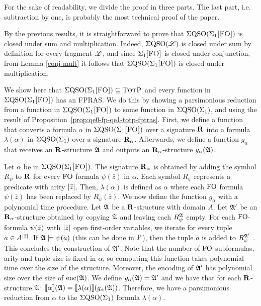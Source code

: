 
For the sake of readability, we divide the proof in three parts. The last part, i.e. subtraction by one, is probably the most technical proof of the paper. 

\medskip

 By the previous results, it is straightforward to prove that $\Sigma{\rm QSO}(\Sigma_{1}\textsc{[FO]})$ is closed under sum and multiplication. Indeed, $\Sigma{\rm QSO}(\mathscr{L})$ is closed under sum by definition for every fragment $\mathscr{L}$, and since $\Sigma_{1}\textsc{[FO]}$ is closed under conjunction, from Lemma \ref{conj-mult} it follows that $\Sigma{\rm QSO}(\Sigma_{1}\textsc{[FO]})$ is closed under multiplication.
\medskip

  We show here that $\Sigma{\rm QSO}(\Sigma_{1}\textsc{[FO]}) \subseteq \text{\sc TotP}$ and every function in $\Sigma{\rm QSO}(\Sigma_{1}\textsc{[FO]})$ has an FPRAS. We do this by showing a parsimonious reduction from a function in $\Sigma{\rm QSO}(\Sigma_{1}\textsc{[FO]})$ to some function in $\Sigma{\rm QSO}(\Sigma_{1})$, and using the result of Proposition~\ref{prop:qe0-fp-qe1-totp-fptras}. First, we define a function that converts a formula $\alpha$ in $\Sigma{\rm QSO}(\Sigma_{1}\textsc{[FO]})$ over a signature $\mathbf{R}$ into a formula $\lambda(\alpha)$ in $\Sigma{\rm QSO}(\Sigma_{1})$ over a signature $\mathbf{R}_{\alpha}$. Afterwards, we define a function $g_{\alpha}$ that receives an $\mathbf{R}$-structure $\mathfrak{A}$ and outputs an $\mathbf{R}_{\alpha}$-structure $g_{\alpha}(\mathfrak{A})$.

Let $\alpha$ be in $\Sigma{\rm QSO}(\Sigma_{1}\textsc{[FO]})$. The signature $\mathbf{R}_{\alpha}$ is obtained by adding the symbol $R_{\psi}$ to $\mathbf{R}$ for every ${\rm FO}$ formula $\psi(\bar{z})$ in $\alpha$. Each symbol $R_{\psi}$ represents a predicate with arity $\vert \bar{z} \vert$. Then, $\lambda(\alpha)$ is defined as $\alpha$ where each ${\rm FO}$ formula $\psi(\bar{z})$ has been replaced by $R_{\psi}(\bar{z})$. We now define the function $g_{\alpha}$ with a polynomial time procedure. Let $\mathfrak{A}$ be a $\mathbf{R}$-structure with domain $A$. Let $\mathfrak{A}'$ be an $\mathbf{R}_{\alpha}$-structure obtained by copying $\mathfrak{A}$ and leaving each $R_{\psi}^{\mathfrak{A}}$ empty. For each ${\rm FO}$-formula $\psi(\bar{z})$ with $\vert \bar{z} \vert$ open first-order variables, we iterate for every tuple $\bar{a} \in A^{\vert \bar{z} \vert}$. If $\mathfrak{A}\models\psi(\bar{a})$ (this can be done in $\text{\sc P}$), then the tuple $\bar{a}$ is added to $R_{\psi}^{\mathfrak{A}'}$ . This concludes the construction of $\mathfrak{A}'$. Note that the number of ${\rm FO}$ subformulas, arity and tuple size is fixed in $\alpha$, so computing this function takes polynomial time over the size of the structure. Moreover, the encoding of $\mathfrak{A}'$ has polynomial size over the size of ${\rm enc}(\mathfrak{A})$. We define $g_{\alpha}(\mathfrak{A}) = \mathfrak{A}'$ and we have that for each $\mathbf{R}$-structure $\mathfrak{A}$: ${\llbracket{}{\alpha}\rrbracket}(\mathfrak{A}) = {\llbracket{}{\lambda(\alpha)}\rrbracket}(g_{\alpha}(\mathfrak{A}))$. Therefore, we have a parsimonious reduction from $\alpha$ to the $\Sigma{\rm QSO}(\Sigma_{1})$ formula $\lambda(\alpha)$.

